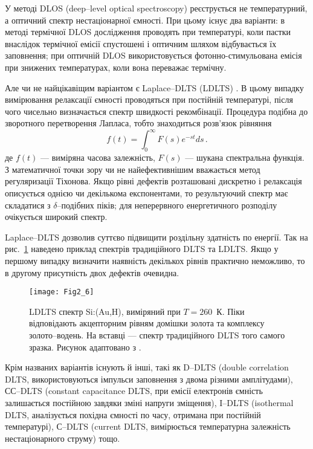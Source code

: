 У методі DLOS (deep--level optical spectroscopy) реєструється не температурний, а оптичний спектр нестаціонарної ємності.
При цьому існує два варіанти:
в методі термічної DLOS дослідження проводять при температурі, коли пастки внаслідок термічної емісії спустошені
і оптичним шляхом відбувається їх заповнення;
при оптичній DLOS використовується фотонно-стимульована емісія при знижених температурах,
коли вона переважає термічну.

Але чи не найцікавіщим варіантом є Laplace--DLTS (LDLTS) \cite{LDLTS2}.
В цьому випадку вимірювання релаксації ємності проводяться при постійній температурі,
після чого чисельно визначається спектр швидкості рекомбінації.
Процедура  подібна до зворотного перетворення Лапласа,
тобто знаходиться розв'язок рівняння
\begin{equation}
\label{DLTSLapl}
f(t)=\int_0^\infty F(s) e^{-st}ds\,.
\end{equation}
де
$f(t)$ --- виміряна часова залежність,
$F(s)$ --- шукана спектральна функція.
З математичної точки зору чи не найефективнішим вважається
метод регуляризації Тіхонова.
Якщо рівні дефектів розташовані дискретно і релаксація описується
однією чи декількома експонентами, то результуючий спектр
має складатися з $\delta$--подібних піків;
для неперервного енергетичного розподілу очікується широкий спектр.

Laplace--DLTS дозволив суттєво підвищити роздільну здатність по енергії.
Так на рис.~\ref{F26} наведено приклад спектрів традиційного DLTS та LDLTS.
Якщо у першому випадку визначити наявність декількох рівнів
практично неможливо, то в другому присутність двох дефектів очевидна.

\begin{figure}[!t]
\center
\vspace{-5mm}
\texttt{[image: Fig2\_6]}
\vspace{-3mm}
\caption{LDLTS спектр Si:(Au,H), виміряний при $T=260$~К.
Піки відповідають акцепторним рівням домішки золота та комплексу
золото--водень.
На вставці --- спектр традиційного DLTS того самого зразка.
Рисунок адаптовано з \cite{Deixler}.
}
\vspace{-3mm}
\label{F26}
\end{figure}

Крім названих варіантів існують й інші, такі як
D--DLTS (double correlation DLTS, використовуються імпульси заповнення з двома різними амплітудами),
СС--DLTS (constant capacitance DLTS, при емісії електронів ємність
залишається постійною завдяки зміні напруги зміщення),
I--DLTS (isothermal DLTS, аналізується похідна ємності по часу, отримана при постійній температурі),
С--DLTS (current DLTS, вимірюється температурна залежність нестаціонарного струму)
тощо.
